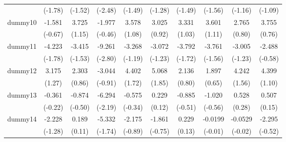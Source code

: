 {\begin{tabular}{l*{9}{c}}
            &     (-1.78)         &     (-1.52)         &     (-2.48)         &     (-1.49)         &     (-1.28)         &     (-1.49)         &     (-1.56)         &     (-1.16)         &     (-1.09)         \\
[1em]
dummy10     &      -1.581         &       3.725         &      -1.977         &       3.578         &       3.025         &       3.331         &       3.601         &       2.765         &       3.755         \\
            &     (-0.67)         &      (1.15)         &     (-0.46)         &      (1.08)         &      (0.92)         &      (1.03)         &      (1.11)         &      (0.80)         &      (0.76)         \\
[1em]
dummy11     &      -4.223         &      -3.415         &      -9.261\sym{**} &      -3.268         &      -3.072         &      -3.792         &      -3.761         &      -3.005         &      -2.488         \\
            &     (-1.78)         &     (-1.53)         &     (-2.80)         &     (-1.19)         &     (-1.23)         &     (-1.72)         &     (-1.56)         &     (-1.23)         &     (-0.58)         \\
[1em]
dummy12     &       3.175         &       2.303         &      -3.044         &       4.402         &       5.068         &       2.136         &       1.897         &       4.242         &       4.399         \\
            &      (1.27)         &      (0.86)         &     (-0.91)         &      (1.72)         &      (1.85)         &      (0.80)         &      (0.65)         &      (1.56)         &      (1.10)         \\
[1em]
dummy13     &      -0.361         &      -0.874         &      -6.294\sym{*}  &      -0.575         &       0.229         &      -0.885         &      -1.020         &       0.528         &       0.507         \\
            &     (-0.22)         &     (-0.50)         &     (-2.19)         &     (-0.34)         &      (0.12)         &     (-0.51)         &     (-0.56)         &      (0.28)         &      (0.15)         \\
[1em]
dummy14     &      -2.228         &       0.189         &      -5.332         &      -2.175         &      -1.861         &       0.229         &     -0.0199         &     -0.0529         &      -2.295         \\
            &     (-1.28)         &      (0.11)         &     (-1.74)         &     (-0.89)         &     (-0.75)         &      (0.13)         &     (-0.01)         &     (-0.02)         &     (-0.52)         \\

\end{tabular}}
